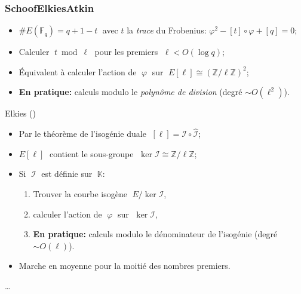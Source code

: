 \documentclass[10pt]{beamer}
\newcommand{\card}[1]{\# #1}  %
\newcommand{\Z}{\mathbb{Z}}  %
\newcommand{\K}{\mathbb{K}}  %
\newcommand{\F}{\mathbb{F}}  %
\newcommand{\isom}{\cong}  %
\newcommand{\frob}{\varphi}  %
\newcommand{\0}{\mathcal{O}}  %
\newcommand{\isog}[1]{\mathcal{#1}}  %
\newcommand{\I}{\isog{I}}  %
\begin{document}

\begin{frame}
  \frametitle{S{\scriptsize choof}E{\scriptsize lkies}A{\scriptsize tkin}}

  \begin{block}{\cite{schoof85}}
    \begin{itemize}
    \item $\card{E(\F_q)} = q + 1 - t\;$ avec $t$ la \emph{trace} du Frobenius:
      $\frob^2 - [t]\circ\frob + [q] = 0$;
    \item Calculer $\;t\bmod\ell\;$ pour les premiers $\;\ell<O(\log q)$;
    \item Équivalent à calculer l'action de $\;\frob\;$ sur $\;E[\ell]\isom(\Z/\ell\Z)^2$;
    \item \textbf{En pratique:} calculs modulo le \emph{polynôme de
        division} (\alert{degré $\sim O(\ell^2)$}).
    \end{itemize}
  \end{block}

  \begin{block}{Elkies (\cite{elkies98,schoof95})}
    \begin{itemize}
    \item Par le théorème de l'isogénie duale $\;[\ell] = \I\circ\hat{\I}$;
    \item $E[\ell]\;$ contient le sous-groupe $\;\ker\I\isom\Z/\ell\Z$;
    \item Si $\;\I\;$ est définie sur $\;\K$:
      \begin{enumerate}
      \item Trouver la \alert<2>{courbe isogène} $\;E/\ker\I$,
      \item calculer l'action de  $\;\frob\;$ sur $\;\ker\I$,
      \item \textbf{En pratique:} calculs modulo le
        \alert<2>{dénominateur} de l'isogénie (\alert{degré $\sim
          O(\ell)$}).
      \end{enumerate}
    \item Marche en moyenne pour la moitié des nombres premiers.
    \end{itemize}
  \end{block}
  
  \cite{atkin88}\dots
\end{frame}

\end{document}
